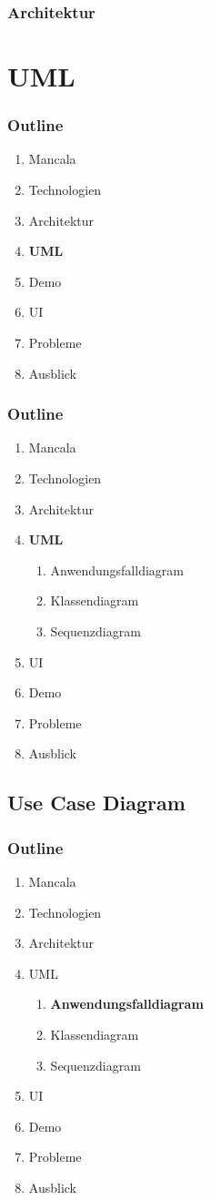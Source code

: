 \documentclass[
	10pt,
	t		%
]{beamer}
\begin{document}
\begin{frame}
\frametitle{Architektur}

\end{frame}

\section{UML}
\begin{frame}
\frametitle{Outline}
\begin{enumerate}
\item Mancala
\item Technologien
\item Architektur
\item \textbf{UML}
\item Demo
\item UI
\item Probleme
\item Ausblick
\end{enumerate}
\end{frame}

\begin{frame}
\frametitle{Outline}
\begin{enumerate}
\item Mancala
\item Technologien
\item Architektur
\item \textbf{UML}
\begin{enumerate}
\item Anwendungsfalldiagram
\item Klassendiagram
\item Sequenzdiagram
\end{enumerate}
\item UI
\item Demo
\item Probleme
\item Ausblick
\end{enumerate}
\end{frame}

\subsection{Use Case Diagram}
\begin{frame}
\frametitle{Outline}
\begin{enumerate}
\item Mancala
\item Technologien
\item Architektur
\item UML
\begin{enumerate}
\item \textbf{Anwendungsfalldiagram}
\item Klassendiagram
\item Sequenzdiagram
\end{enumerate}
\item UI
\item Demo
\item Probleme
\item Ausblick
\end{enumerate}
\end{frame}
\end{document}
